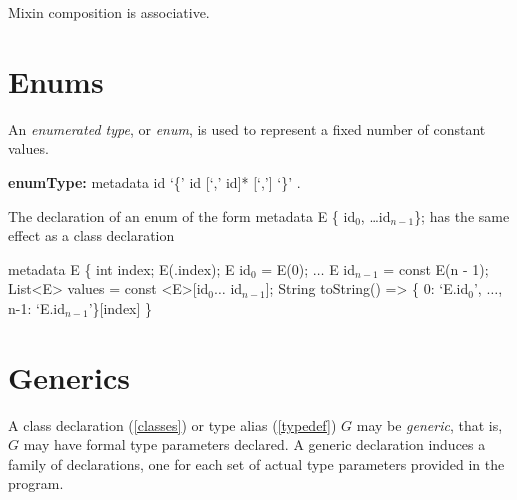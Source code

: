 \documentclass{article}
\newcommand{\code}[1]{{\sf #1}}
\begin{document}
\LMHash{}
Mixin composition is associative.




\section{Enums}

\LMHash{}
An {\em enumerated type}, or {\em enum}, is used to represent a fixed number of constant values.

\begin{grammar}
{\bf enumType:}
metadata \ENUM{} id `\{' id [`,' id]* [`,'] `\}'
    .
\end{grammar}

\LMHash{}
The declaration of an enum of the form \code{metadata \ENUM{} E \{ id$_0$, \ldots id$_{n-1}$\};}
has the same effect as a class declaration

\begin{dartCode}
metadata \CLASS{} E \{
  \FINAL{} int index;
  \CONST{} E(\THIS{}.index);
  \STATIC{} \CONST{} E id$_0$ = \CONST{} E(0);
  $\ldots$
  \STATIC{} \CONST{} E id$_{n-1}$ = const E(n - 1);
  \STATIC{} \CONST{} List<E> values = const <E>[id$_0 \ldots $ id$_{n-1}$];
  String toString() => \{ 0: `E.id$_0$', $\ldots$, n-1: `E.id$_{n-1}$'\}[index]
\}
\end{dartCode}


\section{Generics}

\LMHash{}
A class declaration (\ref{classes}) or type alias (\ref{typedef})
$G$ may be {\em generic}, that is, $G$ may have formal type parameters declared. A generic declaration induces a family of declarations, one for each set of actual type parameters provided in the program.
\end{document}
